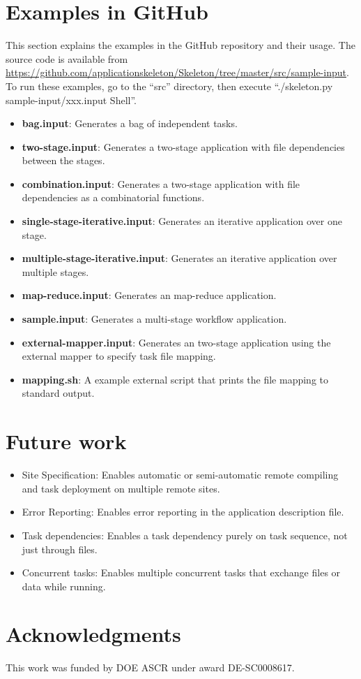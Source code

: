 \documentclass[10pt,a4paper]{article}
\begin{document}
\section{Examples in GitHub}
This section explains the examples in the GitHub repository and their usage. The source code is available from \url{https://github.com/applicationskeleton/Skeleton/tree/master/src/sample-input}.
To run these examples, go to the ``src'' directory, then execute ``./skeleton.py sample-input/xxx.input Shell''.
\begin{itemize}
\item{\bf bag.input}: Generates a bag of independent tasks. 
\item{\bf two-stage.input}: Generates a two-stage application with file dependencies between the stages.
\item{\bf combination.input}: Generates a two-stage application with file dependencies as a combinatorial functions.
\item{\bf single-stage-iterative.input}: Generates an iterative application over one stage.
\item{\bf multiple-stage-iterative.input}: Generates an iterative application over multiple stages.
\item{\bf map-reduce.input}: Generates an map-reduce application.
\item{\bf sample.input}: Generates a multi-stage workflow application.
\item{\bf external-mapper.input}: Generates an two-stage application using the external mapper to specify task file mapping.
\item{\bf mapping.sh}: A example external script that prints the file mapping to standard output.
\end{itemize}

\section{Future work}

\begin{itemize}

\item{Site Specification}: Enables automatic or semi-automatic remote compiling and task deployment on multiple remote sites. 

\item{Error Reporting}: Enables error reporting in the application description file.

\item{Task dependencies}: Enables a task dependency purely on task sequence, not just through files.

\item{Concurrent tasks}: Enables multiple concurrent tasks that exchange files or data while running.


\end{itemize}

\section{Acknowledgments}

This work was funded by DOE ASCR under award DE-SC0008617.



\end{document}
